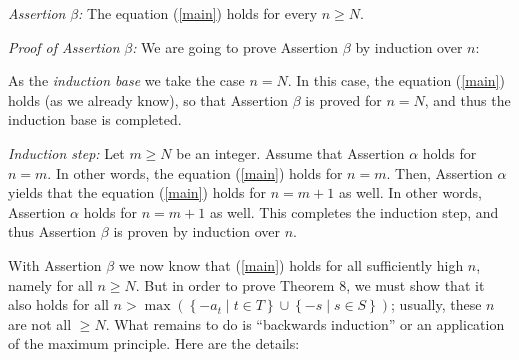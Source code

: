 \documentclass[12pt,final,notitlepage,onecolumn]{article}%
\begin{document}
\textit{Assertion }$\beta$\textit{:} The equation (\ref{main}) holds for every
$n\geq N$.

\textit{Proof of Assertion }$\beta$\textit{:} We are going to prove Assertion
$\beta$ by induction over $n$:

As the \textit{induction base} we take the case $n=N$. In this case, the
equation (\ref{main}) holds (as we already know), so that Assertion $\beta$ is
proved for $n=N$, and thus the induction base is completed.

\textit{Induction step:} Let $m\geq N$ be an integer. Assume that Assertion
$\alpha$ holds for $n=m$. In other words, the equation (\ref{main}) holds for
$n=m$. Then, Assertion $\alpha$ yields that the equation (\ref{main}) holds
for $n=m+1$ as well. In other words, Assertion $\alpha$ holds for $n=m+1$ as
well. This completes the induction step, and thus Assertion $\beta$ is proven
by induction over $n$.

With Assertion $\beta$ we now know that (\ref{main}) holds for all
sufficiently high $n$, namely for all $n\geq N$. But in order to prove Theorem
8, we must show that it also holds for all $n>\max\left(  \left\{  -a_{t}\mid
t\in T\right\}  \cup\left\{  -s\mid s\in S\right\}  \right)  $; usually, these
$n$ are not all $\geq N$. What remains to do is ``backwards induction'' or an
application of the maximum principle. Here are the details:
\end{document}
